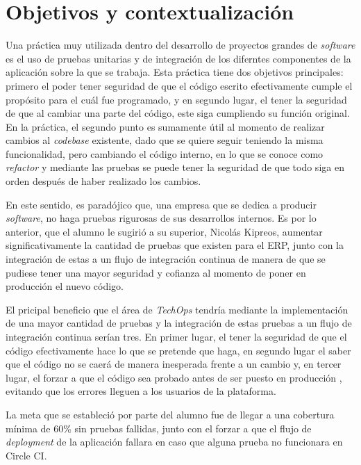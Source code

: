 \textit{}\section{Objetivos y contextualización}

  Una práctica muy utilizada dentro del desarrollo de proyectos grandes de \textit{software} es el uso de pruebas unitarias y de integración de los diferntes componentes de la aplicación sobre la que se trabaja. Esta práctica tiene dos objetivos principales: primero el poder tener seguridad de que el código escrito efectivamente cumple el propósito para el cuál fue programado, y en segundo lugar, el tener la seguridad de que al cambiar una parte del código, este siga cumpliendo su función original. En la práctica, el segundo punto es sumamente útil al momento de realizar cambios al \textit{codebase} existente, dado que se quiere seguir teniendo la misma funcionalidad, pero cambiando el código interno, en lo que se conoce como \textit{refactor} y mediante las pruebas se puede tener la seguridad de que todo siga en orden después de haber realizado los cambios. 
  
  En este sentido, es paradójico que, una empresa que se dedica a producir \textit{software}, no haga pruebas rigurosas de sus desarrollos internos. Es por lo anterior, que el alumno le sugirió a su superior, Nicolás Kipreos, aumentar significativamente la cantidad de pruebas que existen para el ERP, junto con la integración de estas a un flujo de integración continua de manera de que se pudiese tener una mayor seguridad y cofianza al momento de poner en producción el nuevo código.

  El pricipal beneficio que el área de \textit{TechOps} tendría mediante la implementación de una mayor cantidad de pruebas y la integración de estas pruebas a un flujo de integración continua serían tres. En primer lugar, el tener la seguridad de que el código efectivamente hace lo que se pretende que haga, en segundo lugar el saber que el código no se caerá de manera inesperada frente a un cambio y, en tercer lugar, el forzar a que el código sea probado antes de ser puesto en producción \cite{ibm_testing}, evitando que los errores lleguen a los usuarios de la plataforma.

  La meta que se estableció por parte del alumno fue de llegar a una cobertura mínima de 60\% sin pruebas fallidas, junto con el forzar a que el flujo de \textit{deployment} de la aplicación fallara en caso que alguna prueba no funcionara en Circle CI.

